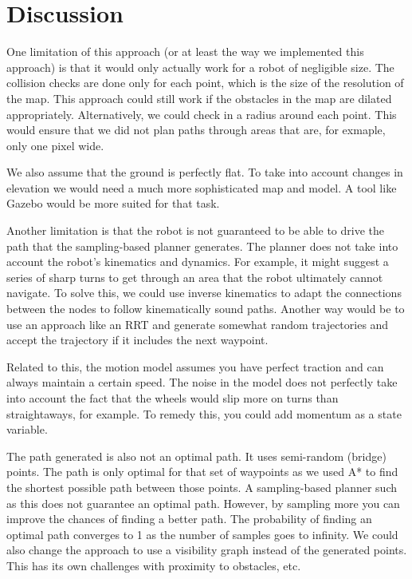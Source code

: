 \documentclass[12pt]{article}
\begin{document}
\section{Discussion}
\setlength{\parindent}{1cm}

One limitation of this approach (or at least the way we implemented this approach) is that it would only actually work for a robot of negligible size. The collision checks are done only for each point, which is the size of the resolution of the map. This approach could still work if the obstacles in the map are dilated appropriately. Alternatively, we could check in a radius around each point. This would ensure that we did not plan paths through areas that are, for exmaple, only one pixel wide.

We also assume that the ground is perfectly flat. To take into account changes in elevation we would need a much more sophisticated map and model. A tool like Gazebo would be more suited for that task.

Another limitation is that the robot is not guaranteed to be able to drive the path that the sampling-based planner generates. The planner does not take into account the robot's kinematics and dynamics. For example, it might suggest a series of sharp turns to get through an area that the robot ultimately cannot navigate. To solve this, we could use inverse kinematics to adapt the connections between the nodes to follow kinematically sound paths. Another way would be to use an approach like an RRT and generate somewhat random trajectories and accept the trajectory if it includes the next waypoint.  

Related to this, the motion model assumes you have perfect traction and can always maintain a certain speed. The noise in the model does not perfectly take into account the fact that the wheels would slip more on turns than straightaways, for example. To remedy this, you could add momentum as a state variable.

The path generated is also not an optimal path. It uses semi-random (bridge) points. The path is only optimal for that set of waypoints as we used A* to find the shortest possible path between those points. A sampling-based planner such as this does not guarantee an optimal path. However, by sampling more you can improve the chances of finding a better path. The probability of finding an optimal path converges to 1 as the number of samples goes to infinity. We could also change the approach to use a visibility graph instead of the generated points. This has its own challenges with proximity to obstacles, etc.  


 
\end{document}

